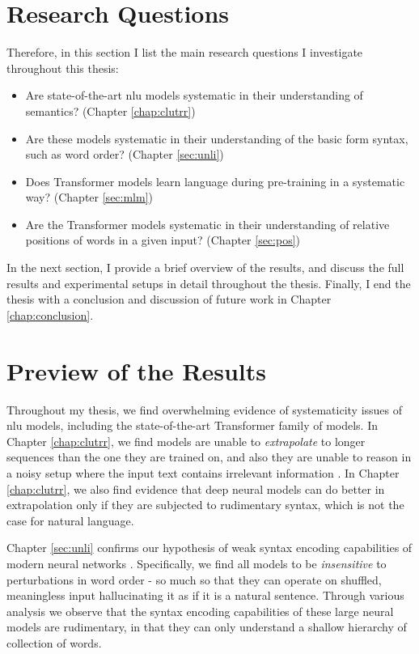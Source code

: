 \documentclass[letterpaper, 12pt]{report}
\begin{document}
\section{Research Questions}

Therefore, in this section I list the main research questions I investigate throughout this thesis:

\begin{itemize}
  \item Are state-of-the-art \acrshort{nlu} models systematic in their understanding of semantics? (Chapter \autoref{chap:clutrr})
  \item Are these models systematic in their understanding of the basic form syntax, such as word order? (Chapter \autoref{sec:unli})
  \item Does Transformer models learn language during pre-training in a systematic way? (Chapter \autoref{sec:mlm})
  \item Are the Transformer models systematic in their understanding of relative positions of words in a given input? (Chapter \autoref{sec:pos})
\end{itemize}

In the next section, I provide a brief overview of the results, and discuss the full results and experimental setups in detail throughout the thesis. Finally, I end the thesis with a conclusion and discussion of future work in Chapter \autoref{chap:conclusion}.

\section{Preview of the Results}

Throughout my thesis, we find overwhelming evidence of systematicity issues of \acrshort{nlu} models, including the state-of-the-art Transformer family of models. In Chapter \autoref{chap:clutrr}, we find models are unable to \textit{extrapolate} to longer sequences than the one they are trained on, and also they are unable to reason in a noisy setup where the input text contains irrelevant information \citep{sinha-etal-2019-clutrr}. In Chapter \autoref{chap:clutrr}, we also find evidence that deep neural models can do better in extrapolation only if they are subjected to rudimentary syntax, which is not the case for natural language.

Chapter \autoref{sec:unli} confirms our hypothesis of weak syntax encoding capabilities of modern neural networks \citep{sinha-etal-2021-unnatural}. Specifically, we find all models to be \textit{insensitive} to perturbations in word order - so much so that they can operate on shuffled, meaningless input hallucinating it as if it is a natural sentence. Through various analysis we observe that the syntax encoding capabilities of these large neural models are rudimentary, in that they can only understand a shallow hierarchy of collection of words.
\end{document}

